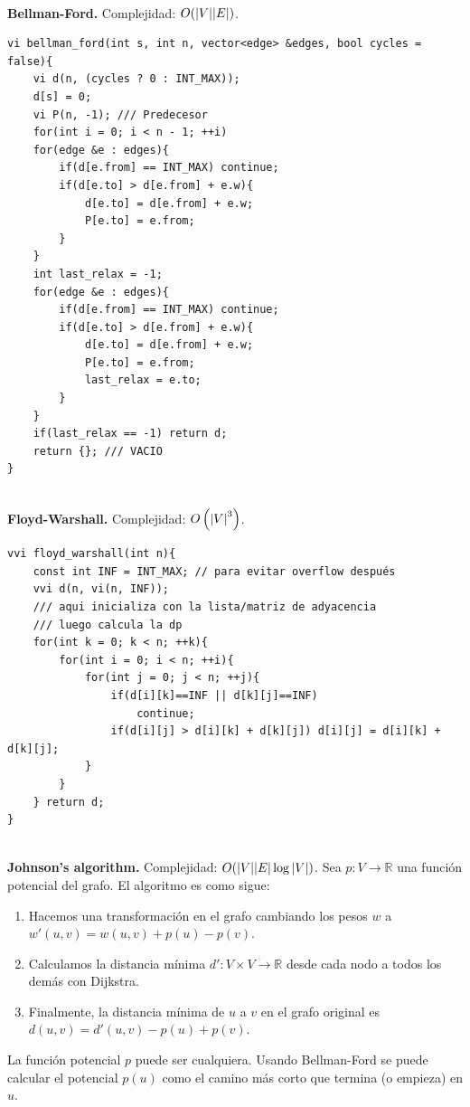 \documentclass[10pt,spanish,mexico]{article}
\numberwithin{equation}{section}
\newcommand{\R}{\mathbb{R}}
\newcommand{\pa}[1]{\left( #1 \right)}
\begin{document}
\begin{multicols}{2}
\vspace{-1.2\baselineskip}
\hrulefill\\
\textbf{Bellman-Ford.} Complejidad: $O(\abs{V}\abs{E})$.
\begin{verbatim}
vi bellman_ford(int s, int n, vector<edge> &edges, bool cycles = false){
    vi d(n, (cycles ? 0 : INT_MAX));
    d[s] = 0;
    vi P(n, -1); /// Predecesor
    for(int i = 0; i < n - 1; ++i)
    for(edge &e : edges){
        if(d[e.from] == INT_MAX) continue;
        if(d[e.to] > d[e.from] + e.w){
            d[e.to] = d[e.from] + e.w;
            P[e.to] = e.from;
        }
    }
    int last_relax = -1;
    for(edge &e : edges){
        if(d[e.from] == INT_MAX) continue;
        if(d[e.to] > d[e.from] + e.w){
            d[e.to] = d[e.from] + e.w;
            P[e.to] = e.from;
            last_relax = e.to;
        }
    }
    if(last_relax == -1) return d;
    return {}; /// VACIO
}
\end{verbatim}

\vspace{-1.2\baselineskip}
\hrulefill \\
\textbf{Floyd-Warshall.} Complejidad: $O\pa{\abs{V}^3}$.
\begin{verbatim}
vvi floyd_warshall(int n){
    const int INF = INT_MAX; // para evitar overflow después
    vvi d(n, vi(n, INF));
    /// aqui inicializa con la lista/matriz de adyacencia
    /// luego calcula la dp
    for(int k = 0; k < n; ++k){
        for(int i = 0; i < n; ++i){
            for(int j = 0; j < n; ++j){
                if(d[i][k]==INF || d[k][j]==INF)
                    continue;
                if(d[i][j] > d[i][k] + d[k][j]) d[i][j] = d[i][k] + d[k][j];
            }
        }
    } return d;
}
\end{verbatim}

\vspace{-1.2\baselineskip}
\hrulefill\\
\textbf{Johnson's algorithm.} Complejidad: $O(\abs{V}\abs{E}\log\abs{V})$. Sea $p: V \to \R$ una función potencial del grafo. El algoritmo es como sigue:
\begin{enumerate}[1.]
    \item Hacemos una transformación en el grafo cambiando los pesos $w$ a $w'(u, v) = w(u, v) + p(u) - p(v)$.
    \item Calculamos la distancia mínima $d': V \times V \to \R$ desde cada nodo a todos los demás con Dijkstra.
    \item Finalmente, la distancia mínima de $u$ a $v$ en el grafo original es $d(u, v) = d'(u, v) - p(u) + p(v)$.
\end{enumerate}
La función potencial $p$ puede ser cualquiera. Usando Bellman-Ford se puede calcular el potencial $p(u)$ como el camino más corto que termina (o empieza) en $u$.


\end{multicols}
\end{document}
